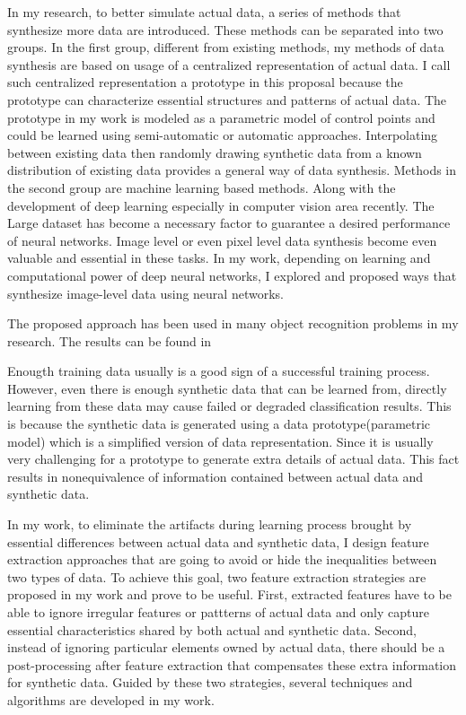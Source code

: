 \documentclass{iitthesis}
\begin{document}
In my research, to better simulate actual data, a series of methods that synthesize more data are introduced. These methods can be separated into two groups. In the first group, different from existing methods, my methods of data synthesis are based on usage of a centralized representation of actual data. I call such centralized representation a prototype in this proposal because the prototype can characterize essential structures and patterns of actual data. The prototype in my work is modeled as a parametric model of control points and could be learned using semi-automatic or automatic approaches. Interpolating between existing data then randomly drawing synthetic data from a known distribution of existing data provides a general way of data synthesis. Methods in the second group are machine learning based methods. Along with the development of deep learning especially in computer vision area recently. The Large dataset has become a necessary factor to guarantee a desired performance of neural networks.  Image level or even pixel level data synthesis become even valuable and essential in these tasks. In my work, depending on learning and computational power of deep neural networks, I explored and proposed ways that synthesize image-level data using neural networks. 

The proposed approach has been used in many object recognition problems in my research. The results can be found in \cite{Zhang2014Autoencoder}\cite{AndiZang2015}\cite{ZX:14}\cite{Ouyang:17}\cite{ZX17:OpticalFlow}

 Enougth training data usually is a good sign of a successful training process. However, even there is enough synthetic data that can be learned from, directly learning from these data may cause failed or degraded classification results. This is because the synthetic data is generated using a data prototype(parametric model) which is a simplified version of data representation. Since it is usually very challenging for a prototype to generate extra details of actual data. This fact results in nonequivalence of information contained between actual data and synthetic data.

In my work, to eliminate the artifacts during learning process brought by essential differences between actual data and synthetic data, I design feature extraction approaches that are going to avoid or hide the inequalities between two types of data. To achieve this goal, two feature extraction strategies are proposed in my work and prove to be useful. First, extracted features have to be able to ignore irregular features or pattterns of actual data and only capture essential characteristics shared by both actual and synthetic data. Second, instead of ignoring particular elements owned by actual data, there should be a post-processing after feature extraction that compensates these extra information for synthetic data. Guided by these two strategies, several techniques and algorithms are developed in my work.
\end{document}
